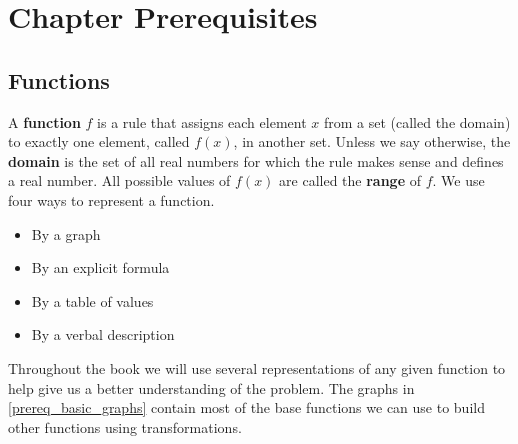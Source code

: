 \section{Chapter Prerequisites}

\prereqIntro

\subsection*{Functions}

A \textbf{function} $f$ is a rule that assigns each element $x$ from a set (called the domain) to exactly one element, called $f(x)$, in another set. Unless we say otherwise, the \textbf{domain} is the set of all real numbers for which the rule makes sense and defines a real number. All possible values of $f(x)$ are called the \textbf{range} of $f$. We use four ways to represent a function.\\
\begin{minipage}{.5\linewidth}
\begin{itemize}
\item By a graph
\item By an explicit formula
\end{itemize}
\end{minipage}%
\begin{minipage}{.5\linewidth}
\begin{itemize}
\item By a table of values
\item By a verbal description
\end{itemize}
\end{minipage}

Throughout the book we will use several representations of any given function to help give us a better understanding of the problem. The graphs in \autoref{prereq_basic_graphs} contain most of the base functions we can use to build other functions using transformations.

